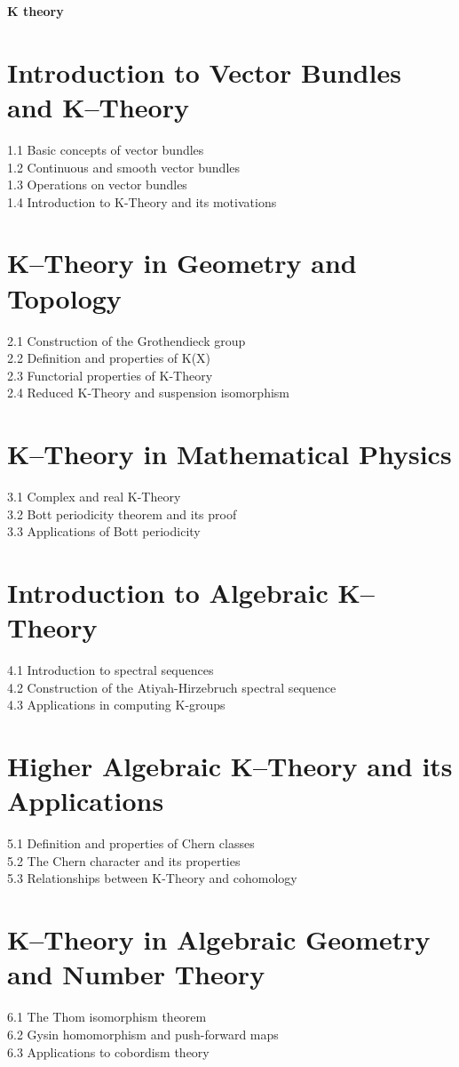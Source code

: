 {\LARGE \bf{K theory}}

\section{Introduction to Vector Bundles and K–Theory}
1.1 Basic concepts of vector bundles\\
1.2 Continuous and smooth vector bundles\\
1.3 Operations on vector bundles\\
1.4 Introduction to K-Theory and its motivations
\section{K–Theory in Geometry and Topology}
2.1 Construction of the Grothendieck group\\
2.2 Definition and properties of K(X)\\
2.3 Functorial properties of K-Theory\\
2.4 Reduced K-Theory and suspension isomorphism
\section{K–Theory in Mathematical Physics}
3.1 Complex and real K-Theory\\
3.2 Bott periodicity theorem and its proof\\
3.3 Applications of Bott periodicity
\section{Introduction to Algebraic K–Theory}
4.1 Introduction to spectral sequences\\
4.2 Construction of the Atiyah-Hirzebruch spectral sequence\\
4.3 Applications in computing K-groups
\section{Higher Algebraic K–Theory and its Applications}
5.1 Definition and properties of Chern classes\\
5.2 The Chern character and its properties\\
5.3 Relationships between K-Theory and cohomology
\section{K–Theory in Algebraic Geometry and Number Theory}
6.1 The Thom isomorphism theorem\\
6.2 Gysin homomorphism and push-forward maps\\
6.3 Applications to cobordism theory
